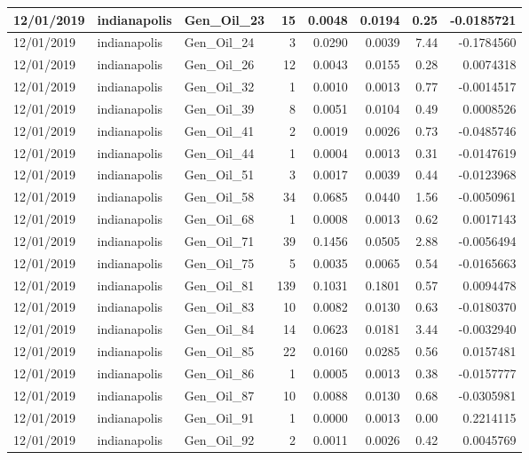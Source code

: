 \documentclass[
  letterpaper,
  DIV=11,
  numbers=noendperiod]{scrartcl}
\begin{document}
\begin{tabular}{l|l|l|r|r|r|r|r}
\hline
12/01/2019 & indianapolis & Gen\_Oil\_23 & 15 & 0.0048 & 0.0194 & 0.25 & -0.0185721\\
\hline
12/01/2019 & indianapolis & Gen\_Oil\_24 & 3 & 0.0290 & 0.0039 & 7.44 & -0.1784560\\
\hline
12/01/2019 & indianapolis & Gen\_Oil\_26 & 12 & 0.0043 & 0.0155 & 0.28 & 0.0074318\\
\hline
12/01/2019 & indianapolis & Gen\_Oil\_32 & 1 & 0.0010 & 0.0013 & 0.77 & -0.0014517\\
\hline
12/01/2019 & indianapolis & Gen\_Oil\_39 & 8 & 0.0051 & 0.0104 & 0.49 & 0.0008526\\
\hline
12/01/2019 & indianapolis & Gen\_Oil\_41 & 2 & 0.0019 & 0.0026 & 0.73 & -0.0485746\\
\hline
12/01/2019 & indianapolis & Gen\_Oil\_44 & 1 & 0.0004 & 0.0013 & 0.31 & -0.0147619\\
\hline
12/01/2019 & indianapolis & Gen\_Oil\_51 & 3 & 0.0017 & 0.0039 & 0.44 & -0.0123968\\
\hline
12/01/2019 & indianapolis & Gen\_Oil\_58 & 34 & 0.0685 & 0.0440 & 1.56 & -0.0050961\\
\hline
12/01/2019 & indianapolis & Gen\_Oil\_68 & 1 & 0.0008 & 0.0013 & 0.62 & 0.0017143\\
\hline
12/01/2019 & indianapolis & Gen\_Oil\_71 & 39 & 0.1456 & 0.0505 & 2.88 & -0.0056494\\
\hline
12/01/2019 & indianapolis & Gen\_Oil\_75 & 5 & 0.0035 & 0.0065 & 0.54 & -0.0165663\\
\hline
12/01/2019 & indianapolis & Gen\_Oil\_81 & 139 & 0.1031 & 0.1801 & 0.57 & 0.0094478\\
\hline
12/01/2019 & indianapolis & Gen\_Oil\_83 & 10 & 0.0082 & 0.0130 & 0.63 & -0.0180370\\
\hline
12/01/2019 & indianapolis & Gen\_Oil\_84 & 14 & 0.0623 & 0.0181 & 3.44 & -0.0032940\\
\hline
12/01/2019 & indianapolis & Gen\_Oil\_85 & 22 & 0.0160 & 0.0285 & 0.56 & 0.0157481\\
\hline
12/01/2019 & indianapolis & Gen\_Oil\_86 & 1 & 0.0005 & 0.0013 & 0.38 & -0.0157777\\
\hline
12/01/2019 & indianapolis & Gen\_Oil\_87 & 10 & 0.0088 & 0.0130 & 0.68 & -0.0305981\\
\hline
12/01/2019 & indianapolis & Gen\_Oil\_91 & 1 & 0.0000 & 0.0013 & 0.00 & 0.2214115\\
\hline
12/01/2019 & indianapolis & Gen\_Oil\_92 & 2 & 0.0011 & 0.0026 & 0.42 & 0.0045769\\

\end{tabular}
\end{document}
